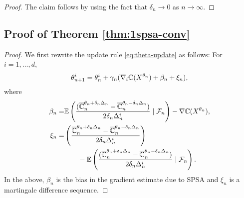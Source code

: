 \begin{proof}
The claim follows by using the fact that $\delta_n \rightarrow 0$ as $n\rightarrow \infty$.
\end{proof}

\subsection*{Proof of Theorem \ref{thm:1spsa-conv}}

\begin{proof}

We first rewrite the update rule \eqref{eq:theta-update} as follows: For $i=1,\ldots,d$,
\begin{align}
\theta^{i}_{n+1}  =  \theta^{i}_n +  \gamma_n(\nabla_{i} \mathbb{C}(X^{\theta_n}) + \beta_n + \xi_n), 
\label{eq:1spsa-equiv}
\end{align}
where 
\begin{align*}
\beta_n = &\mathbb{E}\left(\dfrac{(\overline {\mathbb{C}}_n^{\theta_n + \delta_n \Delta_n} -\overline {\mathbb{C}}_n^{\theta_n - \delta_n \Delta_n})}{2 \delta_n \Delta_n^{i}} \mid \mathcal{F}_n \right) - \nabla \mathbb{C}(X^{\theta_n}),\\
\xi_n = & \left(\dfrac{\overline {\mathbb{C}}_n^{\theta_n + \delta_n \Delta_n} -\overline {\mathbb{C}}_n^{\theta_n - \delta_n \Delta_n}}{2 \delta_n\Delta_n^{i}}\right) \\
&\qquad - \mathbb{E}\left(\dfrac{(\overline {\mathbb{C}}_n^{\theta_n + \delta_n \Delta_n} -\overline {\mathbb{C}}_n^{\theta_n - \delta_n \Delta_n})}{2 \delta_n \Delta_n^{i}}\mid \mathcal{F}_n \right).
\end{align*}
In the above, $\beta_n$ is the bias in the gradient estimate due to SPSA and $\xi_n$ is a martingale difference sequence.


\end{proof}
